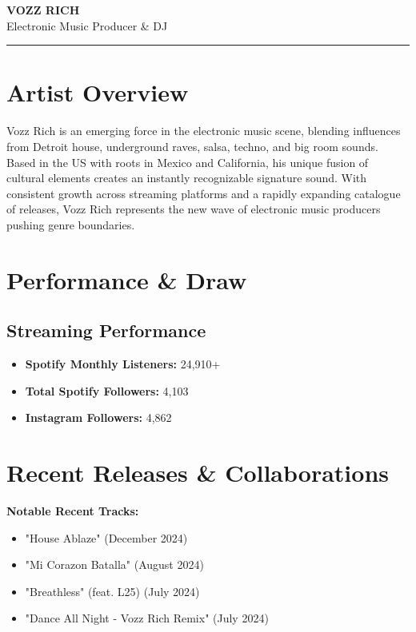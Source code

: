\documentclass[11pt]{article}
\begin{document}
\begin{center}
{\huge \textbf{VOZZ RICH}}\\[0.5cm]
{\large Electronic Music Producer \& DJ}\\[0.3cm]
\rule{\textwidth}{1pt}
\end{center}

\section*{Artist Overview}
Vozz Rich is an emerging force in the electronic music scene, blending influences from Detroit house, underground raves, salsa, techno, and big room sounds. Based in the US with roots in Mexico and California, his unique fusion of cultural elements creates an instantly recognizable signature sound. With consistent growth across streaming platforms and a rapidly expanding catalogue of releases, Vozz Rich represents the new wave of electronic music producers pushing genre boundaries.

\section*{Performance \& Draw}

\subsection*{Streaming Performance}
\begin{itemize}
\item \textbf{Spotify Monthly Listeners:} 24,910+
\item \textbf{Total Spotify Followers:} 4,103
\item \textbf{Instagram Followers:} 4,862
\end{itemize}

\section*{Recent Releases \& Collaborations}

\textbf{Notable Recent Tracks:}
\begin{itemize}
\item "House Ablaze" (December 2024)
\item "Mi Corazon Batalla" (August 2024)
\item "Breathless" (feat. L25) (July 2024)
\item "Dance All Night - Vozz Rich Remix" (July 2024)
\end{itemize}
\end{document}
